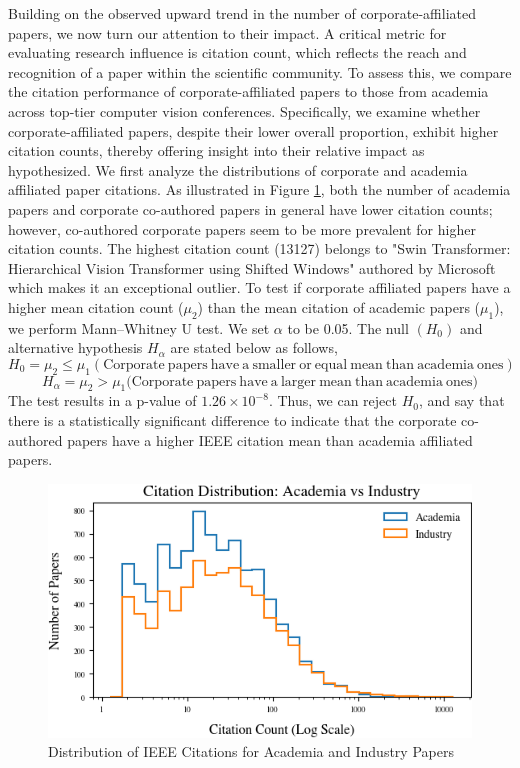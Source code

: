 \documentclass{article}
\begin{document}
Building on the observed upward trend in the number of corporate-affiliated papers, we now turn our attention to their impact. A critical metric for evaluating research influence is citation count, which reflects the reach and recognition of a paper within the scientific community. To assess this, we compare the citation performance of corporate-affiliated papers to those from academia across top-tier computer vision conferences. Specifically, we examine whether corporate-affiliated papers, despite their lower overall proportion, exhibit higher citation counts, thereby offering insight into their relative impact as hypothesized. We first analyze the distributions of corporate and academia affiliated paper citations. As illustrated in Figure \ref{fig:ieee_citations}, both the number of academia papers and corporate co-authored papers in general have lower citation counts; however, co-authored corporate papers seem to be more prevalent for higher citation counts. The highest citation count (13127) belongs to "Swin Transformer: Hierarchical Vision Transformer using Shifted Windows" authored by Microsoft which makes it an exceptional outlier. To test if corporate affiliated papers have a higher mean citation count ($\mu_2$) than the mean citation of academic papers ($\mu_1$), we perform Mann–Whitney U test. We set $\alpha$ to be 0.05. The null $(H_0)$ and alternative hypothesis $H_\alpha$ are stated below as follows,
\[
H_0 = \mu_2 \leq \mu_1 (\mathrm{Corporate \ papers\ have \ a \ smaller \ or \ equal \ mean \ than \ academia \ ones})
\]
\[
H_\alpha = \mu_2 > \mu_1 (\mathrm{Corporate \ papers\ have \ a \ larger \ mean\ than \ academia \ ones)}
\]
The test results in a p-value of $1.26 \times 10^{-8}$. Thus, we can reject $H_0$, and say that there is a statistically significant difference to indicate that the corporate co-authored papers have a higher IEEE citation mean than academia affiliated papers.   

\begin{figure}
    \centering
    \includegraphics[width=0.6\linewidth]{images/histogram_ieee_citations.png}
    \caption{Distribution of IEEE Citations for Academia and Industry Papers}
    \label{fig:ieee_citations}
\end{figure}
\end{document}

